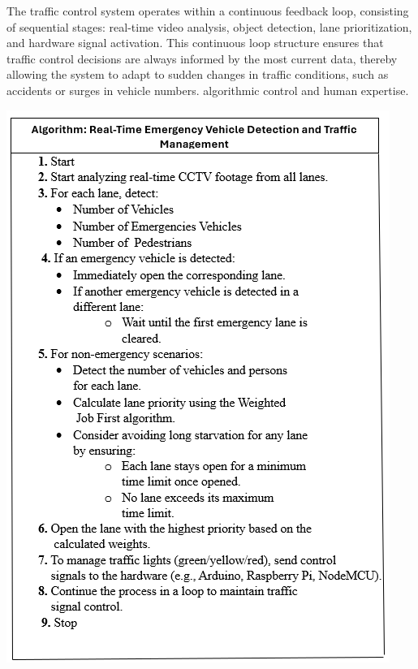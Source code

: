 \documentclass[conference]{IEEEtran}
\begin{document}
The traffic control system operates within a continuous feedback loop, 
consisting of sequential stages: real-time video analysis, object detection, lane prioritization, and hardware signal activation. This continuous loop structure ensures that traffic control decisions are always informed by the most current data, thereby allowing the system to adapt to sudden changes in traffic conditions, such as accidents or surges in vehicle numbers.  algorithmic control and human expertise.
\noindent %
\begin{minipage}{0.5\textwidth}
    \centering
    \includegraphics[width=\textwidth]{10.png} %
    \vspace{0.3cm}
\end{minipage}%
\end{document}
